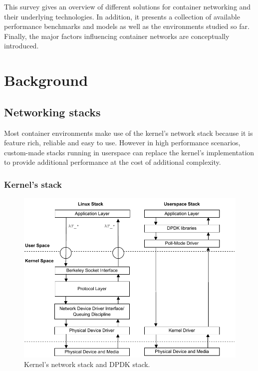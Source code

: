 \documentclass[conference]{IEEEtran}
\begin{document}
This survey gives an overview of different solutions for container networking and their underlying technologies. In addition, it presents a collection of available performance benchmarks and models as well as the environments studied so far.  Finally, the major factors influencing container networks are conceptually introduced. 

\section{Background}

\subsection{Networking stacks}
Most container environments make use of the kernel's network stack because it is feature rich, reliable and easy to use. However in high performance scenarios, custom-made stacks running in userspace can replace the kernel's implementation to provide additional performance at the cost of additional complexity.  
\subsubsection{Kernel's stack}

\begin{figure}[!t]
\centering
\includegraphics[scale=0.6]{kernel_stack.pdf}
\caption{Kernel's network stack \cite{kernel_stack} and DPDK stack.}
\label{kernel_stack}
\end{figure}
\end{document}
